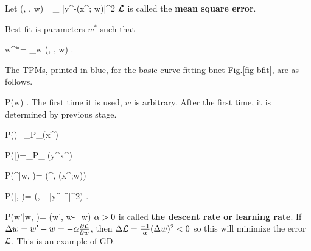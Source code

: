 Let 
\beq
\call(\vecx, \vecy, w)=
\sum_\s
|y^\s-\haty(x^\s; w)|^2
\;
\eeq
${\cal L}$ is called the {\bf mean square error}.

Best fit is parameters $w^*$
such that

\beq 
w^*= \argmin_w
\call(\vecx, \vecy, w)
\;.
\eeq

The TPMs, printed in blue, for
the basic curve fitting bnet
 Fig.\ref{fig-bfit}, are
as follows.

\beq\color{blue}
P(w) 
\;.
\eeq
The first time
it is used, $w$ is arbitrary.
After the first time, it is determined 
by previous stage.

\beq\color{blue}
P(\vecx)=\prod_\s P_\rvx(x^\s)
\eeq

\beq\color{blue}
P(\vecy|\vecx)=\prod_\s P_{\rvy|\rvx}(y^\s\mid x^\s)
\eeq

\beq\color{blue}
P(\haty^\s|w, \vecx)=
\delta(\haty^\s, \haty(x^\s;w))
\eeq


\beq\color{blue}
P(\call|\vec{\haty}, \vecy)=
\delta(\call,
\sum_\s |y^\s-\haty^\s|^2)
\;.
\eeq


\beq\color{blue}
P(w'|w, \call)=
\delta(w',
w-\alp\partial_w\call)
\eeq
$\alpha>0$ is called {\bf the descent rate or learning rate}.
If $\Delta w=w'-w=-\alpha 
\frac{\partial{\cal L}}
{\partial w}$, then
 $\Delta {\cal L}=\frac{-1}{\alpha}
(\Delta w)^2<0$  so this will
minimize the error
${\cal L}$.
This is an example of GD.